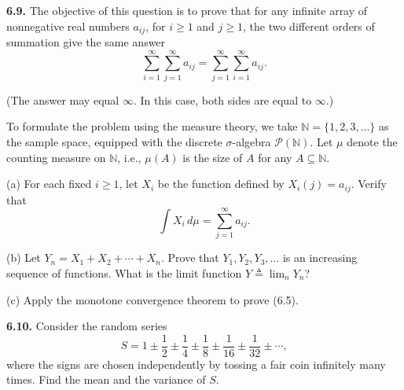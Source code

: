 \textbf{6.9.} The objective of this question is to prove that for any infinite array of nonnegative real numbers $a_{ij}$, for $i\ge 1$ and $j\ge 1$, the two different orders of summation give the same answer
\begin{equation}
\sum_{i=1}^{\infty}\sum_{j=1}^{\infty} a_{ij}
=
\sum_{j=1}^{\infty}\sum_{i=1}^{\infty} a_{ij}.
\tag{6.5}
\end{equation}

(The answer may equal $\infty$. In this case, both sides are equal to $\infty$.)

To formulate the problem using the measure theory, we take $\mathbb{N}=\{1,2,3,\dots\}$ as the sample space, equipped with the discrete $\sigma$-algebra $\mathcal{P}(\mathbb{N})$. Let $\mu$ denote the counting measure on $\mathbb{N}$, i.e., $\mu(A)$ is the size of $A$ for any $A\subseteq \mathbb{N}$.

\noindent (a) For each fixed $i\ge 1$, let $X_i$ be the function defined by $X_i(j)=a_{ij}$. Verify that
\[
\int X_i\, d\mu = \sum_{j=1}^{\infty} a_{ij}.
\]

\noindent (b) Let $Y_n=X_1+X_2+\cdots+X_n$. Prove that $Y_1,Y_2,Y_3,\dots$ is an increasing sequence of functions. What is the limit function $Y \triangleq \lim_n Y_n$?

\noindent (c) Apply the monotone convergence theorem to prove (6.5).

\textbf{6.10.} Consider the random series
\[
S = 1 \pm \frac{1}{2} \pm \frac{1}{4} \pm \frac{1}{8} \pm \frac{1}{16} \pm \frac{1}{32} \pm \cdots,
\]
where the signs are chosen independently by tossing a fair coin infinitely many times. Find the mean and the variance of $S$.
